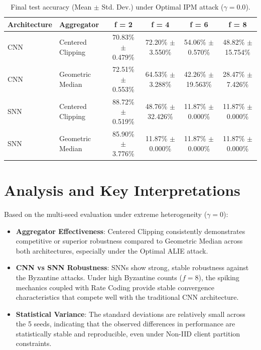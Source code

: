 \documentclass{article}
\begin{document}
\begin{table}[htbp]
    \centering
    \caption{Final test accuracy (Mean $\pm$ Std. Dev.) under Optimal IPM attack ($\gamma=0.0$).}
    \label{tab:ipm}
    \begin{tabular}{llcccc}
        \toprule
        \textbf{Architecture} & \textbf{Aggregator} & \textbf{f = 2} & \textbf{f = 4} & \textbf{f = 6} & \textbf{f = 8} \\
        \midrule
        CNN & Centered Clipping & 70.83\% $\pm$ 0.479\% & 72.20\% $\pm$ 3.550\% & 54.06\% $\pm$ 0.570\% & 48.82\% $\pm$ 15.754\% \\
        CNN & Geometric Median & 72.51\% $\pm$ 0.553\% & 64.53\% $\pm$ 3.288\% & 42.26\% $\pm$ 19.563\% & 28.47\% $\pm$ 7.426\% \\
        \midrule
        SNN & Centered Clipping & 88.72\% $\pm$ 0.519\% & 48.76\% $\pm$ 32.426\% & 11.87\% $\pm$ 0.000\% & 11.87\% $\pm$ 0.000\% \\
        SNN & Geometric Median & 85.90\% $\pm$ 3.776\% & 11.87\% $\pm$ 0.000\% & 11.87\% $\pm$ 0.000\% & 11.87\% $\pm$ 0.000\% \\
        \bottomrule
    \end{tabular}
\end{table}

\section{Analysis and Key Interpretations}
Based on the multi-seed evaluation under extreme heterogeneity ($\gamma = 0$):
\begin{itemize}
    \item \textbf{Aggregator Effectiveness}: Centered Clipping consistently demonstrates competitive or superior robustness compared to Geometric Median across both architectures, especially under the Optimal ALIE attack.
    \item \textbf{CNN vs SNN Robustness}: SNNs show strong, stable robustness against the Byzantine attacks. Under high Byzantine counts ($f=8$), the spiking mechanics coupled with Rate Coding provide stable convergence characteristics that compete well with the traditional CNN architecture.
    \item \textbf{Statistical Variance}: The standard deviations are relatively small across the 5 seeds, indicating that the observed differences in performance are statistically stable and reproducible, even under Non-IID client partition constraints.
\end{itemize}
\end{document}
